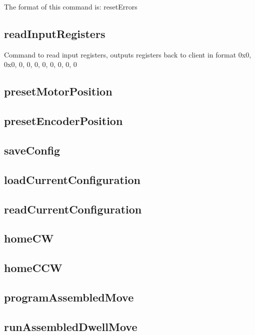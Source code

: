 The format of this command is\+: {\ttfamily reset\+Errors}\hypertarget{index_readInputRegisters}{}\subsection{read\+Input\+Registers}\label{index_readInputRegisters}
Command to read input registers, outputs registers back to client in format 0x0, 0x0, 0, 0, 0, 0, 0, 0, 0, 0\hypertarget{index_presetMotorPosition}{}\subsection{preset\+Motor\+Position}\label{index_presetMotorPosition}
\hypertarget{index_presetEncoderPosition}{}\subsection{preset\+Encoder\+Position}\label{index_presetEncoderPosition}
\hypertarget{index_saveConfig}{}\subsection{save\+Config}\label{index_saveConfig}
\hypertarget{index_loadCurrentConfiguration}{}\subsection{load\+Current\+Configuration}\label{index_loadCurrentConfiguration}
\hypertarget{index_readCurrentConfiguration}{}\subsection{read\+Current\+Configuration}\label{index_readCurrentConfiguration}
\hypertarget{index_homeCW}{}\subsection{home\+C\+W}\label{index_homeCW}
\hypertarget{index_homeCCW}{}\subsection{home\+C\+C\+W}\label{index_homeCCW}
\hypertarget{index_programAssembledMove}{}\subsection{program\+Assembled\+Move}\label{index_programAssembledMove}
\hypertarget{index_runAssembledDwellMove}{}\subsection{run\+Assembled\+Dwell\+Move}\label{index_runAssembledDwellMove}
